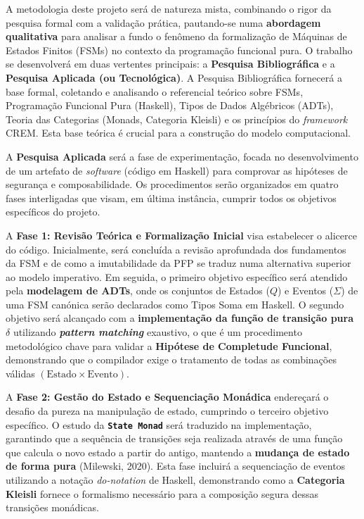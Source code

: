 \documentclass[12pt,a4paper]{article}
\begin{document}
A metodologia deste projeto será de natureza mista, combinando o rigor da pesquisa formal com a validação prática, pautando-se numa \textbf{abordagem qualitativa} para analisar a fundo o fenômeno da formalização de Máquinas de Estados Finitos (FSMs) no contexto da programação funcional pura. O trabalho se desenvolverá em duas vertentes principais: a \textbf{Pesquisa Bibliográfica} e a \textbf{Pesquisa Aplicada (ou Tecnológica)}. A Pesquisa Bibliográfica fornecerá a base formal, coletando e analisando o referencial teórico sobre FSMs, Programação Funcional Pura (Haskell), Tipos de Dados Algébricos (ADTs), Teoria das Categorias (Monads, Categoria Kleisli) e os princípios do \textit{framework} CREM. Esta base teórica é crucial para a construção do modelo computacional.

A \textbf{Pesquisa Aplicada} será a fase de experimentação, focada no desenvolvimento de um artefato de \textit{software} (código em Haskell) para comprovar as hipóteses de segurança e composabilidade. Os procedimentos serão organizados em quatro fases interligadas que visam, em última instância, cumprir todos os objetivos específicos do projeto.

A \textbf{Fase 1: Revisão Teórica e Formalização Inicial} visa estabelecer o alicerce do código. Inicialmente, será concluída a revisão aprofundada dos fundamentos da FSM e de como a imutabilidade da PFP se traduz numa alternativa superior ao modelo imperativo. Em seguida, o primeiro objetivo específico será atendido pela \textbf{modelagem de ADTs}, onde os conjuntos de Estados ($Q$) e Eventos ($\Sigma$) de uma FSM canónica serão declarados como Tipos Soma em Haskell. O segundo objetivo será alcançado com a \textbf{implementação da função de transição pura $\delta$} utilizando \textbf{\textit{pattern matching}} exaustivo, o que é um procedimento metodológico chave para validar a \textbf{Hipótese de Completude Funcional}, demonstrando que o compilador exige o tratamento de todas as combinações válidas $(\text{Estado} \times \text{Evento})$.

A \textbf{Fase 2: Gestão do Estado e Sequenciação Monádica} endereçará o desafio da pureza na manipulação de estado, cumprindo o terceiro objetivo específico. O estudo da \textbf{\texttt{State Monad}} será traduzido na implementação, garantindo que a sequência de transições seja realizada através de uma função que calcula o novo estado a partir do antigo, mantendo a \textbf{mudança de estado de forma pura} (Milewski, 2020). Esta fase incluirá a sequenciação de eventos utilizando a notação \textit{do-notation} de Haskell, demonstrando como a \textbf{Categoria Kleisli} fornece o formalismo necessário para a composição segura dessas transições monádicas.
\end{document}
